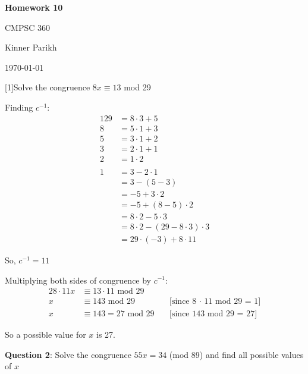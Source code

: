 \documentclass{article} %
\newcommand{\question}[2][]{\begin{flushleft}
        \textbf{Question #1}: #2

\end{flushleft}}
\newcommand{\maketitletwo}[2][]{\begin{center}
        \Large{\textbf{Homework #1}
            
            CMPSC 360} %
        \vspace{5pt}
        
        \normalsize{Kinner Parikh  %
        
        \today}        %
        \vspace{15pt}
        
\end{center}}
\begin{document}
    \maketitletwo[10]  %
    
    \question[1]{Solve the congruence $8x \equiv 13$ mod 29}

    Finding $c^{-1}:$
    \begin{alignat*}{1}
        29 &= 8 \cdot 3 + 5\\
        8  &= 5 \cdot 1 + 3\\
        5  &= 3 \cdot 1 + 2\\
        3  &= 2 \cdot 1 + 1\\
        2  &= 1 \cdot 2\\
        \\
        1 &= 3 - 2 \cdot 1\\
          &= 3 - (5 - 3)\\
          &= -5 + 3 \cdot 2\\
          &= -5 + (8 - 5) \cdot 2\\
          &= 8 \cdot 2 - 5 \cdot 3\\
          &= 8 \cdot 2 - (29 - 8 \cdot 3) \cdot 3\\
          &= 29 \cdot (-3) + 8 \cdot 11
    \end{alignat*}

    So, $c^{-1} = 11$

    Multiplying both sides of congruence by $c^{-1}$:
    \begin{alignat*}{2}
        8 \cdot 11x &\equiv 13 \cdot 11 \text{ mod } 29\ \\
        x &\equiv 143 \text{ mod } 29 && \text{[since 8 $\cdot$ 11 mod 29 = 1]}\\
        x &\equiv 143 = 27 \text{ mod } 29\ && \text{[since 143 mod 29 = 27]}
    \end{alignat*}

    So a possible value for $x$ is 27.

    \newpage

    \question[2]{Solve the congruence $55x = 34$ (mod 89) and find all possible values of $x$}
\end{document}
